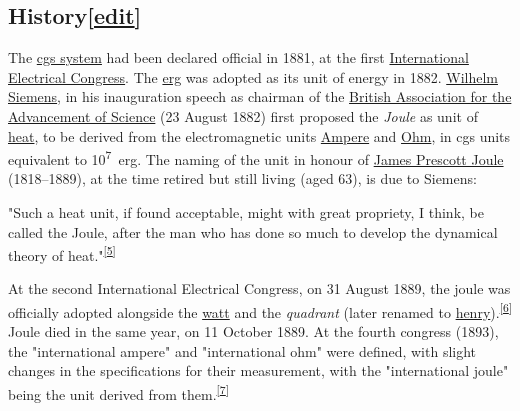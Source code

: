 \documentclass[
]{article}
\newenvironment{LTR}{\beginL}{\endL}
\begin{document}
\begin{LTR}
\begin{otherlanguage}{english}
\subsection[{{{[}}\href{/w/index.php?title=Joule&action=edit&section=2}{{edit}}{{]}}}]{\texorpdfstring{\label{History}{History}{{{[}}\href{/w/index.php?title=Joule&action=edit&section=2}{{edit}}{{]}}}}{History{[}edit{]}}}\label{historyedit}

The \href{/wiki/Cgs_system}{cgs system} had been declared official in
1881, at the first
\href{/wiki/International_Electrical_Congress}{International Electrical
Congress}. The \href{/wiki/Erg}{erg} was adopted as its unit of energy
in 1882. \href{/wiki/Carl_Wilhelm_Siemens}{Wilhelm Siemens}, in his
inauguration speech as chairman of the
\href{/wiki/British_Association_for_the_Advancement_of_Science}{British
Association for the Advancement of Science} (23 August 1882) first
proposed the \emph{Joule} as unit of \href{/wiki/Heat}{heat}, to be
derived from the electromagnetic units \href{/wiki/Ampere}{Ampere} and
\href{/wiki/Ohm}{Ohm}, in cgs units equivalent to
{{}10\textsuperscript{7}~erg}. The naming of the unit in honour of
\href{/wiki/James_Prescott_Joule}{James Prescott Joule} (1818--1889), at
the time retired but still living (aged 63), is due to Siemens:

"Such a heat unit, if found acceptable, might with great propriety, I
think, be called the Joule, after the man who has done so much to
develop the dynamical theory of
heat."\textsuperscript{\hyperref[cite_note-5]{{[}5{]}}}

At the second International Electrical Congress, on 31 August 1889, the
joule was officially adopted alongside the \href{/wiki/Watt}{watt} and
the \emph{quadrant} (later renamed to
\href{/wiki/Henry_(unit)}{henry}).\textsuperscript{\hyperref[cite_note-6]{{[}6{]}}}
Joule died in the same year, on 11 October 1889. At the fourth congress
(1893), the "international ampere" and "international ohm" were defined,
with slight changes in the specifications for their measurement, with
the "international joule" being the unit derived from
them.\textsuperscript{\hyperref[cite_note-7]{{[}7{]}}}


\end{otherlanguage}
\end{LTR}
\end{document}
